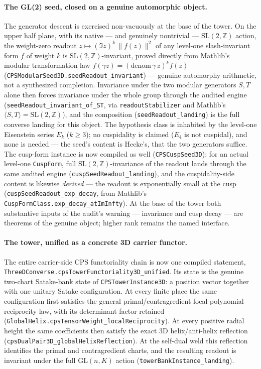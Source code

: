 \documentclass[11pt]{article}
\theoremstyle{definition}
\begin{document}
\paragraph{The GL(2) seed, closed on a genuine automorphic object.} The generator descent is
exercised non-vacuously at the base of the tower. On the upper half plane, with its native ---
and genuinely nontrivial --- $\mathrm{SL}(2,\mathbb Z)$ action, the weight-zero readout
$z\mapsto (\Im z)^{k}\,\lVert f(z)\rVert^{2}$ of any level-one slash-invariant form $f$ of weight
$k$ is $\mathrm{SL}(2,\mathbb Z)$-invariant, proved directly from Mathlib's modular transformation
law $f(\gamma z)=(\text{denom}\,\gamma\,z)^{k}f(z)$
(\texttt{CPSModularSeed3D.seedReadout\_invariant}) --- genuine automorphy arithmetic, not a
synthesized completion. Invariance under the two modular generators $S,T$ alone then forces
invariance under the whole group through the audited engine
(\texttt{seedReadout\_invariant\_of\_ST}, via \texttt{readoutStabilizer} and Mathlib's
$\langle S,T\rangle=\mathrm{SL}(2,\mathbb Z)$), and the composition
(\texttt{seedReadout\_landing}) is the full converse landing for this object. The hypothesis class
is inhabited by the level-one Eisenstein series $E_{k}$ ($k\ge3$); no cuspidality is claimed
($E_{4}$ is not cuspidal), and none is needed --- the seed's content is Hecke's, that the two
generators suffice.  The cusp-form instance is now compiled as well (\texttt{CPSCuspSeed3D}):
for an actual level-one \texttt{CuspForm}, full $\mathrm{SL}(2,\mathbb Z)$-invariance of the
readout lands through the same audited engine (\texttt{cuspSeedReadout\_landing}), and the
cuspidality-side content is likewise \emph{derived} --- the readout is exponentially small at
the cusp (\texttt{cuspSeedReadout\_exp\_decay}, from Mathlib's
\texttt{CuspFormClass.exp\_decay\_atImInfty}).  At the base of the tower both substantive
inputs of the audit's warning --- invariance and cusp decay --- are theorems of the genuine
object; higher rank remains the named interface.

\paragraph{The tower, unified as a concrete 3D carrier functor.}  The entire carrier-side CPS
functoriality chain is now one compiled statement,
\texttt{ThreeDConverse.cpsTowerFunctoriality3D\_unified}.  Its state is the genuine two-chart
Satake-bank state of \texttt{CPSTowerInstance3D}: a position vector together with one unitary
Satake configuration.  At every finite place the same configuration first satisfies the general
primal/contragredient local-polynomial reciprocity law, with its determinant factor retained
(\texttt{GlobalHelix.cpsTensorWeight\_localReciprocity}).  At every positive radial height the
same coefficients then satisfy the exact 3D helix/anti-helix reflection
(\texttt{cpsDualPair3D\_globalHelixReflection}).  At the self-dual weld this reflection identifies
the primal and contragredient charts, and the resulting readout is invariant under the full
$\mathrm{GL}(n,K)$ action (\texttt{towerBankInstance\_landing}).
\end{document}
